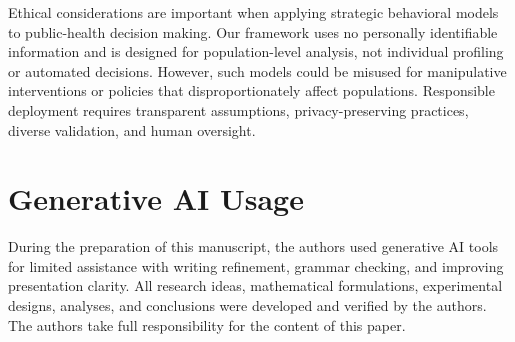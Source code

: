 \documentclass[sigconf,review]{acmart}
\begin{document}
Ethical considerations are important when applying strategic behavioral models to public-health decision making. Our framework uses no personally identifiable information and is designed for population-level analysis, not individual profiling or automated decisions. However, such models could be misused for manipulative interventions or policies that disproportionately affect populations. Responsible deployment requires transparent assumptions, privacy-preserving practices, diverse validation, and human oversight.

\section*{Generative AI Usage}

During the preparation of this manuscript, the authors used generative AI tools for limited assistance with writing refinement, grammar checking, and improving presentation clarity. All research ideas, mathematical formulations, experimental designs, analyses, and conclusions were developed and verified by the authors. The authors take full responsibility for the content of this paper.



\end{document}

